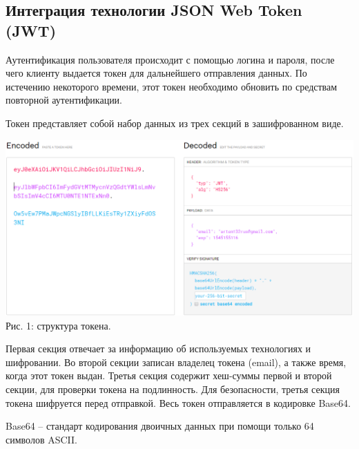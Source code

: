 \documentclass[14pt,a4paper,openbib]{extarticle}
\numberwithin{equation}{section}
\begin{document}
\newpage
\subsection{Интеграция технологии JSON Web Token (JWT)}
Аутентификация пользователя происходит с помощью логина и пароля, после чего клиенту выдается токен для дальнейшего отправления данных. По истечению некоторого времени, этот токен необходимо обновить по средствам повторной аутентификации.

Токен представляет собой набор данных из трех секций в зашифрованном виде.
\begin{center}
\includegraphics[width=\textwidth]{img/token1.png}\\
Рис. 1: структура токена.\\[\baselineskip]
\end{center}
Первая секция отвечает за информацию об используемых технологиях и шифровании. Во второй секции записан владелец токена (email), а также время, когда этот токен выдан. Третья секция содержит хеш-суммы первой и второй секции, для проверки токена на подлинность. Для безопасности, третья секция токена шифруется перед отправкой. Весь токен отправляется в кодировке Base64.

Base64 – стандарт кодирования двоичных данных при помощи только 64 символов ASCII.


\newpage
\end{document}
